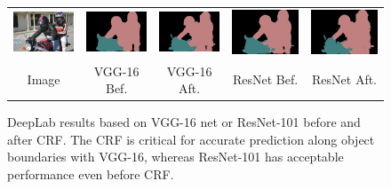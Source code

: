 \begin{figure}[!t]
{\begin{tabular}{c @{\hskip 5pt} c @{\hskip 5pt} c @{\hskip 5pt} c @{\hskip 5pt} c}
    \includegraphics[width=0.21\linewidth]{fig/res_vs_vgg/resnet101_noup_pool3_14/img/2011_000455.jpg} &
    \includegraphics[width=0.21\linewidth]{fig/res_vs_vgg/vgg128_noup_pool3_20M_largewin3_newcode5/res_none/2011_000455.png} &
    \includegraphics[width=0.21\linewidth]{fig/res_vs_vgg/vgg128_noup_pool3_20M_largewin3_newcode5/res_crf/2011_000455.png} &
    \includegraphics[width=0.21\linewidth]{fig/res_vs_vgg/resnet101_noup_pool3_14/res_none/2011_000455.png} &
    \includegraphics[width=0.21\linewidth]{fig/res_vs_vgg/resnet101_noup_pool3_14/res_crf/2011_000455.png} \\

    {\scriptsize Image} &
    {\scriptsize VGG-16 Bef.} &
    {\scriptsize VGG-16 Aft.} &
    {\scriptsize ResNet Bef.} &
    {\scriptsize ResNet Aft.} \\
  \end{tabular}
  }
  \caption{DeepLab results based on VGG-16 net or ResNet-101 before and after CRF.
    The CRF is critical for accurate prediction along object boundaries with VGG-16, whereas
    ResNet-101 has acceptable performance even before CRF.}
  \label{fig:res_vs_vgg_results}
\end{figure}

